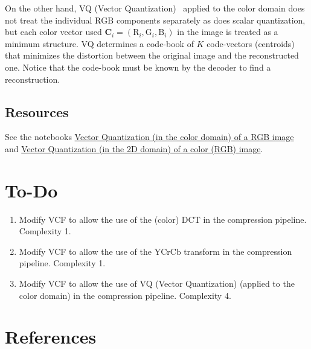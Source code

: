 On the other hand, VQ (Vector
Quantization)~\cite{vruiz__vector_quantization,sayood2017introduction}
applied to the color domain does not treat the individual $\text{RGB}$
components separately as does scalar quantization, but each color vector used ${\mathbf C}_i = (\text{R}_i, \text{G}_i, \text{B}_i )$ in the
image is treated as a minimum structure. VQ determines a code-book of
$K$ code-vectors (centroids) that minimizes the distortion between the
original image and the reconstructed one. Notice that the code-book
must be known by the decoder to find a reconstruction.

\subsection*{Resources}
See the notebooks
\href{https://github.com/vicente-gonzalez-ruiz/vector_quantization/blob/main/docs/RGB_VQ.ipynb}{Vector
  Quantization (in the color domain) of a RGB image} and
\href{https://github.com/vicente-gonzalez-ruiz/vector_quantization/blob/main/docs/spatial_color_VQ.ipynb}{Vector
  Quantization (in the 2D domain) of a color (RGB) image}.

\section{To-Do}
\begin{enumerate}
\item Modify VCF to allow the use of the (color) $\text{DCT}$ in the
  compression pipeline. Complexity 1.
\item Modify VCF to allow the use of the $\text{YCrCb}$ transform in
  the compression pipeline. Complexity 1.
\item Modify VCF to allow the use of VQ (Vector Quantization) (applied to
  the color domain) in the compression pipeline. Complexity 4.
\end{enumerate}

\section{References}

\renewcommand{\addcontentsline}[3]{}%

